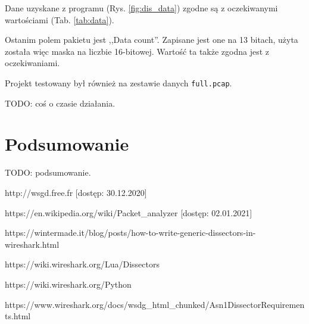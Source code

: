 \documentclass[a4paper, 12pt, twoside, openright]{article}
\begin{document}
Dane uzyskane z programu (Rys. \ref{fig:dis_data}) zgodne są z oczekiwanymi wartościami (Tab. \ref{tab:data}).

Ostanim polem pakietu jest ,,Data count''. Zapisane jest one na 13 bitach, użyta została więc maska na liczbie 16-bitowej.
Wartość ta także zgodna jest z oczekiwaniami.

Projekt testowany był również na zestawie danych \texttt{full.pcap}.

TODO: coś o czasie działania.

\newpage
\section{Podsumowanie}

TODO: podsumowanie.

\newpage

\begin{thebibliography}{99}

		http://wsgd.free.fr [dostęp: 30.12.2020]

		https://en.wikipedia.org/wiki/Packet\_analyzer [dostęp: 02.01.2021]

		https://wintermade.it/blog/posts/how-to-write-generic-dissectors-in-wireshark.html

		https://wiki.wireshark.org/Lua/Dissectors

		https://wiki.wireshark.org/Python

		https://www.wireshark.org/docs/wsdg\_html\_chunked/Asn1DissectorRequirements.html


\end{thebibliography}


\vspace{85mm}
\end{document}
